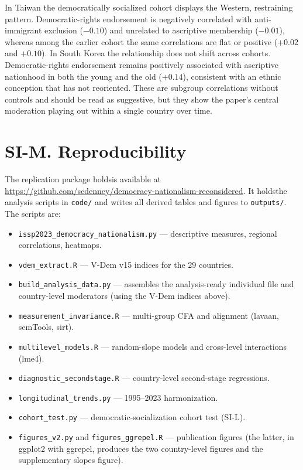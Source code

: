In Taiwan the democratically socialized cohort displays the Western, restraining pattern. Democratic-rights endorsement is negatively correlated with anti-immigrant exclusion ($-0.10$) and unrelated to ascriptive membership ($-0.01$), whereas among the earlier cohort the same correlations are flat or positive ($+0.02$ and $+0.10$). In South Korea the relationship does not shift across cohorts. Democratic-rights endorsement remains positively associated with ascriptive nationhood in both the young and the old ($+0.14$), consistent with an ethnic conception that has not reoriented. These are subgroup correlations without controls and should be read as suggestive, but they show the paper's central moderation playing out within a single country over time.

\clearpage
\section{SI-M. Reproducibility}\label{si-m.-reproducibility}

The replication package \ifanon holds\else is available at \url{https://github.com/scdenney/democracy-nationalism-reconsidered}. It holds\fi the analysis scripts in \texttt{code/} and writes all derived tables and figures to \texttt{outputs/}. The scripts are:

\begin{itemize}
\tightlist
\item
  \texttt{issp2023\_democracy\_nationalism.py} --- descriptive measures, regional correlations, heatmaps.
\item
  \texttt{vdem\_extract.R} --- V-Dem v15 indices for the 29 countries.
\item
  \texttt{build\_analysis\_data.py} --- assembles the analysis-ready individual file and country-level moderators (using the V-Dem indices above).
\item
  \texttt{measurement\_invariance.R} --- multi-group CFA and alignment (lavaan, semTools, sirt).
\item
  \texttt{multilevel\_models.R} --- random-slope models and cross-level interactions (lme4).
\item
  \texttt{diagnostic\_secondstage.R} --- country-level second-stage regressions.
\item
  \texttt{longitudinal\_trends.py} --- 1995--2023 harmonization.
\item
  \texttt{cohort\_test.py} --- democratic-socialization cohort test (SI-L).
\item
  \texttt{figures\_v2.py} and \texttt{figures\_ggrepel.R} --- publication figures (the latter, in ggplot2 with ggrepel, produces the two country-level figures and the supplementary slopes figure).
\end{itemize}

